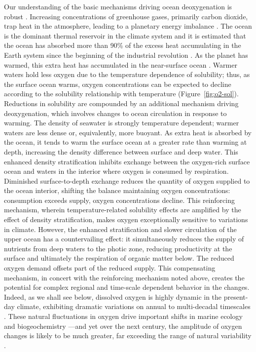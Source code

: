 \documentclass{report_chapter}
\begin{document}
Our understanding of the basic mechanisms driving ocean deoxygenation is robust \citep{Keeling-Kortzinger-etal-2010,Gruber-2011,Bopp-Quere-etal-2002,Najjar-Keeling-2000,Plattner-Joos-etal-2002,Matear-Hirst-2003}.
Increasing concentrations of greenhouse gases, primarily carbon dioxide, trap heat in the atmosphere, leading to a planetary energy imbalance \citep{Trenberth-Fasullo-etal-2014}.
The ocean is the dominant thermal reservoir in the climate system and it is estimated that the ocean has absorbed more than 90\% of the excess heat accumulating in the Earth system since the beginning of the industrial revolution \citep{Rhein-Rintoul-etal-2013,Loeb-Lyman-etal-2012,Cheng-Trenberth-etal-2016}.
As the planet has warmed, this extra heat has accumulated in the near-surface ocean \citep{Levitus-Antonov-etal-2012,Balmaseda-Trenberth-etal-2013,Abraham-Baringer-etal-2013}.
Warmer waters hold less oxygen due to the temperature dependence of solubility; thus, as the surface ocean warms, oxygen concentrations can be expected to decline according to the solubility relationship with temperature (Figure~\ref{fig:o2-sol}).
Reductions in solubility are compounded by an additional mechanism driving deoxygenation, which involves changes to ocean circulation in response to warming.
The density of seawater is strongly temperature dependent; warmer waters are less dense or, equivalently, more buoyant.
As extra heat is absorbed by the ocean, it tends to warm the surface ocean at a greater rate than warming at depth, increasing the density difference between surface and deep water.
This enhanced density stratification inhibits exchange between the oxygen-rich surface ocean and waters in the interior where oxygen is consumed by respiration.
Diminished surface-to-depth exchange reduces the quantity of oxygen supplied to the ocean interior, shifting the balance maintaining oxygen concentrations: consumption exceeds supply, oxygen concentrations decline.
This reinforcing mechanism, wherein temperature-related solubility effects are amplified by the effect of density stratification, makes oxygen exceptionally sensitive to variations in climate.
However, the enhanced stratification and slower circulation of the upper ocean has a countervailing effect: it simultaneously reduces the supply of nutrients from deep waters to the photic zone, reducing productivity at the surface and ultimately the respiration of organic matter below.
The reduced oxygen demand offsets part of the reduced supply.
This compensating mechanism, in concert with the reinforcing mechanism noted above, creates the potential for complex regional and time-scale dependent behavior in the \OO{} changes.
Indeed, as we shall see below, dissolved oxygen is highly dynamic in the present-day climate, exhibiting dramatic variations on annual to multi-decadal timescales \citep{Ito-Deutsch-2010,Deutsch-Brix-etal-2011}.
These natural fluctuations in oxygen drive important shifts in marine ecology and biogeochemistry \citep[e.g.,][]{Rabalais-Diaz-etal-2010,Zamora-Oschlies-etal-2012,Deutsch-Berelson-etal-2014,Yang-Gruber-etal-2016}---and yet over the next century, the amplitude of oxygen changes is likely to be much greater, far exceeding the range of natural variability \citep{Long-Deutsch-etal-2016,Rodgers-Lin-etal-2015,Henson-Beaulieu-etal-2017}.
\end{document}
